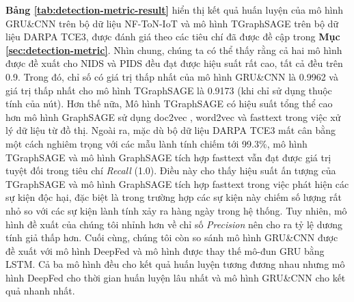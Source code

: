 \textbf{Bảng \ref{tab:detection-metric-result}} hiển thị kết quả huấn luyện của mô hình GRU\&CNN trên bộ dữ liệu NF-ToN-IoT và mô hình TGraphSAGE trên bộ dữ liệu DARPA TCE3, được đánh giá theo các tiêu chí đã được đề cập trong \textbf{Mục \ref{sec:detection-metric}}. Nhìn chung, chúng ta có thể thấy rằng cả hai mô hình được đề xuất cho NIDS và PIDS đều đạt được hiệu suất rất cao, tất cả đều trên 0.9. Trong đó, chỉ số có giá trị thấp nhất của mô hình GRU\&CNN là 0.9962 và giá trị thấp nhất cho mô hình TGraphSAGE là 0.9173 (khi chỉ sử dụng thuộc tính của nút). Hơn thế nữa, Mô hình TGraphSAGE có hiệu suất tổng thể cao hơn mô hình GraphSAGE sử dụng doc2vec \cite{le2014distributed}, word2vec \cite{church2017word2vec} và fasttext \cite{bojanowski2017enriching} trong việc xử lý dữ liệu từ đồ thị. Ngoài ra, mặc dù bộ dữ liệu DARPA TCE3 mất cân bằng một cách nghiêm trọng với các mẫu lành tính chiếm tới 99.3\%, mô hình TGraphSAGE và mô hình GraphSAGE tích hợp fasttext vẫn đạt được giá trị tuyệt đối trong tiêu chí \textit{Recall} (1.0). Điều này cho thấy hiệu suất ấn tượng của TGraphSAGE và mô hình GraphSAGE tích hợp fasttext trong việc phát hiện các sự kiện độc hại, đặc biệt là trong trường hợp các sự kiện này chiếm số lượng rất nhỏ so với các sự kiện lành tính xảy ra hàng ngày trong hệ thống. Tuy nhiên, mô hình đề xuất của chúng tôi nhỉnh hơn về chỉ số \textit{Precision} nên cho ra tỷ lệ dương tính giả thấp hơn. Cuối cùng, chúng tôi còn so sánh mô hình GRU\&CNN được đề xuất với mô hình DeepFed và mô hình được thay thế mô-đun GRU bằng LSTM. Cả ba mô hình đều cho kết quả huấn luyện tương đương nhau nhưng mô hình DeepFed cho thời gian huấn luyện lâu nhất và mô hình GRU\&CNN cho kết quả nhanh nhất.



